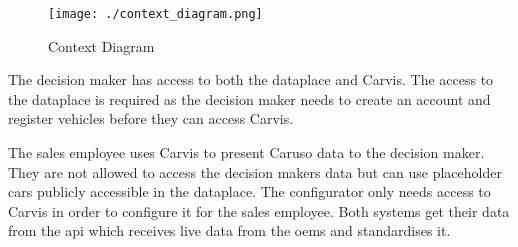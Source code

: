 \begin{figure}[ht]
  \centering
  \texttt{[image: ./context\_diagram.png]}
  \caption{Context Diagram}
  \label{ScopeOfWork:ContextDiagram}
\end{figure}

The decision maker has access to both the \gls{dataplace} and Carvis. The access to the \gls{dataplace} is required as the decision maker needs to create an account and register vehicles before they can access Carvis.

The sales employee uses Carvis to present Caruso data to the decision maker. They are not allowed to access the decision makers data but can use placeholder cars publicly accessible in the \gls{dataplace}. The configurator only needs access to Carvis in order to configure it for the sales employee. Both systems get their data from the \gls{api} which receives live data from the \glspl{oem} and standardises it.
